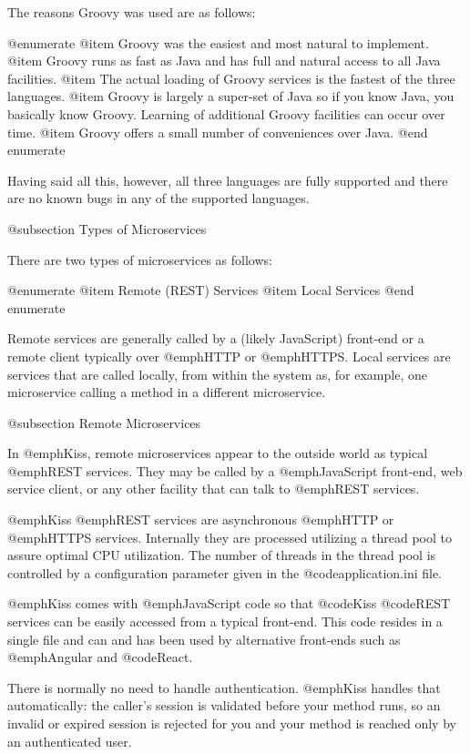 The reasons Groovy was used are as follows:

@enumerate
@item
Groovy was the easiest and most natural to implement.
@item
Groovy runs as fast as Java and has full and natural access to all 
Java facilities.
@item
The actual loading of Groovy services is the fastest of the three languages.
@item
Groovy is largely a super-set of Java so if you know Java, you basically
know Groovy.  Learning of additional Groovy facilities can occur over
time.
@item
Groovy offers a small number of conveniences over Java.
@end enumerate

Having said all this, however, all three languages are fully supported
and there are no known bugs in any of the supported languages.

@subsection Types of Microservices

There are two types of microservices as follows:

@enumerate
@item
Remote (REST) Services
@item
Local Services
@end enumerate

Remote services are generally called by a (likely JavaScript)
front-end or a remote client typically over @emph{HTTP} or
@emph{HTTPS}.  Local services are services that are called locally,
from within the system as, for example, one microservice calling a
method in a different microservice.

@subsection Remote Microservices

In @emph{Kiss}, remote microservices appear to the outside world as
typical @emph{REST} services.  They may be called by a
@emph{JavaScript} front-end, web service client, or any other facility
that can talk to @emph{REST} services.

@emph{Kiss} @emph{REST} services are asynchronous @emph{HTTP} or
@emph{HTTPS} services.  Internally they are processed utilizing a
thread pool to assure optimal CPU utilization.  The number of threads
in the thread pool is controlled by a configuration parameter given in
the @code{application.ini} file.

@emph{Kiss} comes with @emph{JavaScript} code so that @code{Kiss}
@code{REST} services can be easily accessed from a typical front-end.
This code resides in a single file and can and has been used by
alternative front-ends such as @emph{Angular} and @code{React}.

There is normally no need to handle authentication.  @emph{Kiss} handles
that automatically: the caller's session is validated before your method
runs, so an invalid or expired session is rejected for you and your
method is reached only by an authenticated user.

